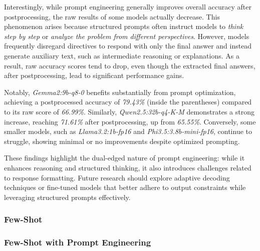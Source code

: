 Interestingly, while prompt engineering generally improves overall accuracy after postprocessing, the raw results of some models actually decrease. This phenomenon arises because structured prompts often instruct models to \textit{think step by step} or \textit{analyze the problem from different perspectives}. However, models frequently disregard directives to respond with only the final answer and instead generate auxiliary text, such as intermediate reasoning or explanations. As a result, raw accuracy scores tend to drop, even though the extracted final answers, after postprocessing, lead to significant performance gains.

Notably, \textit{Gemma2:9b-q8-0} benefits substantially from prompt optimization, achieving a postprocessed accuracy of \textit{79.43\%} (inside the parentheses) compared to its raw score of \textit{66.99\%}. Similarly, \textit{Qwen2.5:32b-q4-K-M} demonstrates a strong increase, reaching \textit{71.61\%} after postprocessing, up from \textit{65.55\%}. Conversely, some smaller models, such as \textit{Llama3.2:1b-fp16} and \textit{Phi3.5:3.8b-mini-fp16}, continue to struggle, showing minimal or no improvements despite optimized prompting.

These findings highlight the dual-edged nature of prompt engineering: while it enhances reasoning and structured thinking, it also introduces challenges related to response formatting. Future research should explore adaptive decoding techniques or fine-tuned models that better adhere to output constraints while leveraging structured prompts effectively.

\subsubsection{Few-Shot}

\subsubsection{Few-Shot with Prompt Engineering}